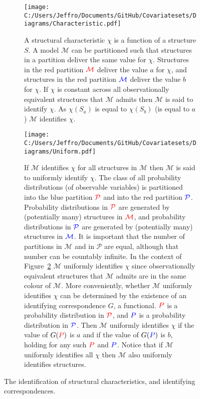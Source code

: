 \documentclass[10pt,a4paper,twoside]{article}
\numberwithin{equation}{section}
\begin{document}
\begin{figure}[p]
\centering
\begin{subfigure}{0.8\textwidth}
  \centering
  \texttt{[image: C:/Users/Jeffro/Documents/GitHub/Covariatesets/Diagrams/Characteristic.pdf]}
  \caption{A structural characteristic $\chi$ is a function of a structure $S$. A model $\mathcal{M}$ can be partitioned such that structures in a partition deliver the same value for $\chi$. Structures in the red partition $\color{red}\mathcal{M}$ deliver the value $a$ for $\chi$, and structures in the red partition $\color{blue}\mathcal{M}$ deliver the value $b$ for $\chi$. If $\chi$ is constant across all observationally equivalent structures that $\mathcal{M}$ admits then $\mathcal{M}$ is said to identify $\chi$. As $\chi(S_a)$ is equal to $\chi(S_b)$ (is equal to $a$) $\mathcal{M}$ identifies $\chi$.}
  \label{fig:characteristic}
  \end{subfigure}
  \begin{subfigure}{0.8\textwidth}
  \centering
  \texttt{[image: C:/Users/Jeffro/Documents/GitHub/Covariatesets/Diagrams/Uniform.pdf]}
  \caption{If $\mathcal{M}$ identifies $\chi$ for all structures in $\mathcal{M}$ then $\mathcal{M}$ is said to uniformly identify $\chi$. The class of all probability distributions (of observable variables) is partitioned into the blue partition $\color{red}\mathcal{P}$ and into the red partition $\color{blue}\mathcal{P}$. Probability distributions in $\color{red}\mathcal{P}$ are generated by (potentially many) structures in $\color{red}\mathcal{M}$, and probability distributions in $\color{blue}\mathcal{P}$ are generated by (potentially many) structures in $\color{blue}\mathcal{M}$. It is important that the number of partitions in $\mathcal{M}$ and in $\mathcal{P}$ are equal, although that number can be countably infinite. In the context of Figure~\ref{fig:uniform} $\mathcal{M}$ uniformly identifies $\chi$ since observationally equivalent structures that $\mathcal{M}$ admits are in the same colour of $\mathcal{M}$. More conveniently, whether $\mathcal{M}$ uniformly identifies $\chi$ can be determined by the existence of an identifying correspondence $G$, a functional. $\color{red}P$ is a probability distribution in $\color{red}\mathcal{P}$, and $\color{blue}P$ is a probability distribution in $\color{blue}\mathcal{P}$. Then $\mathcal{M}$ uniformly identifies $\chi$ if the value of $G(\color{red}P\color{black})$ is $a$ and if the value of $G(\color{blue}P\color{black})$ is $b$, holding for any such $\color{red}P$ and $\color{blue}P$. Notice that if $\mathcal{M}$ uniformly identifies all $\chi$ then $\mathcal{M}$ also uniformly identifies structures.}
  \label{fig:uniform}
  \end{subfigure}
  \caption{The identification of structural characteristics, and identifying correspondences.}
  \label{fig:characteristics}
\end{figure}
\end{document}
